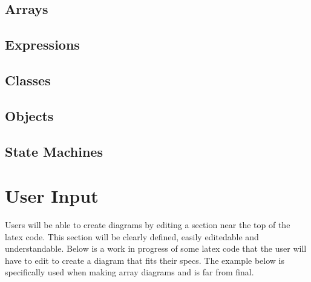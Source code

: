 \documentclass[10pt,a4paper,english]{article}
\begin{document}
\newpage
\thispagestyle{fancy}
\begin{flushleft}

\subsection*{Arrays}

\subsection*{Expressions}

\subsection*{Classes}

\subsection*{Objects}

\subsection*{State Machines}

\section{User Input}
Users will be able to create diagrams by editing a section near the top of the latex code.  This section will be clearly defined, easily editedable and understandable.  Below is a work in progress of some latex code that the user will have to edit to create a diagram that fits their specs. The example below is specifically used when making array diagrams and is far from final.


\end{flushleft}
\end{document}
